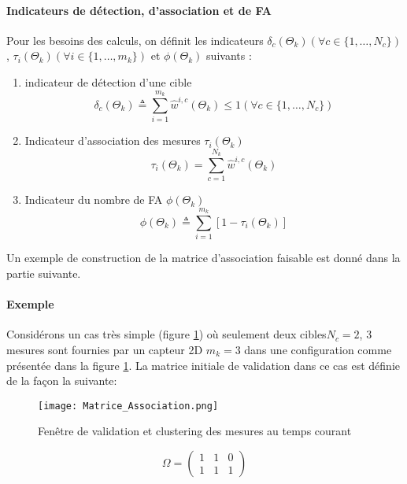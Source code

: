 \documentclass[10pt,french,a4paper]{report}
\begin{document}
\paragraph{Indicateurs de détection, d'association et de \acf{FA}}
Pour les besoins des calculs, on définit les indicateurs $\delta_c(\Theta_k)  (\forall c \in\{1,\ldots,N_c\})$, $\tau_i(\Theta_k) (\forall i \in\{1,\ldots,m_k\})$ et $\phi(\Theta_k)$ suivants :
\begin{enumerate}[label=\arabic*.]
\item  indicateur de détection d'une cible 
		   \begin{equation}
 \delta_c(\Theta_k) \triangleq  \sum_{i=1}^{m_k} \hat{w}^{i,c}(\Theta_k)  \leq  1  (\forall c \in\{1,\ldots,N_c\})
	 \end{equation}	 
	 \item Indicateur d'association des mesures $\tau_i(\Theta_k)$
	 		   \begin{equation}
 \tau_i(\Theta_k) = \sum_{c=1}^{N_k} \hat{w}^{i,c}(\Theta_k)
	 \end{equation}	
	 \item Indicateur du nombre de \acf{FA} $ \phi(\Theta_k)$
 \begin{equation}
	 \phi(\Theta_k) \triangleq  \sum_{i=1}^{m_k} [ 1 -  \tau_i(\Theta_k)]
	  \end{equation}	
\end{enumerate}
Un exemple de construction de la matrice d'association faisable est donné dans la partie suivante. 
\paragraph{Exemple}
Considérons un cas très simple (figure \ref{fig:matriceAssociation}) où seulement deux cibles$N_c=2$, 3 mesures sont fournies par un capteur 2D $m_k=3$ dans une configuration comme présentée dans la figure \ref{fig:matriceAssociation}. La matrice initiale de validation dans ce cas est définie de la façon la suivante:
\begin{figure}
\texttt{[image: Matrice\_Association.png]}
\caption{Fenêtre de validation et clustering des mesures au temps courant}
\label{fig:matriceAssociation} 
\end{figure}


 \begin{equation}
 	  \Omega =
 \begin{pmatrix}
 1 &1 &0\\
 1 &1 &1
 \end{pmatrix}
	  \end{equation}
\end{document}
